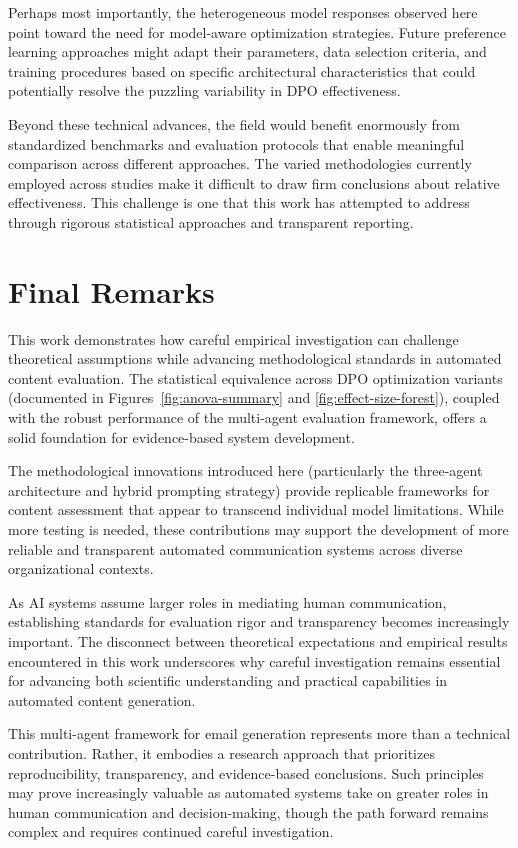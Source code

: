 Perhaps most importantly, the heterogeneous model responses observed here point toward the need for model-aware optimization strategies. Future preference learning approaches might adapt their parameters, data selection criteria, and training procedures based on specific architectural characteristics that could potentially resolve the puzzling variability in DPO effectiveness.

Beyond these technical advances, the field would benefit enormously from standardized benchmarks and evaluation protocols that enable meaningful comparison across different approaches. The varied methodologies currently employed across studies make it difficult to draw firm conclusions about relative effectiveness. This challenge is one that this work has attempted to address through rigorous statistical approaches and transparent reporting.


\section{Final Remarks}
\label{sec:final-remarks}

This work demonstrates how careful empirical investigation can challenge theoretical assumptions while advancing methodological standards in automated content evaluation. The statistical equivalence across DPO optimization variants (documented in Figures~\ref{fig:anova-summary} and \ref{fig:effect-size-forest}), coupled with the robust performance of the multi-agent evaluation framework, offers a solid foundation for evidence-based system development.

The methodological innovations introduced here (particularly the three-agent architecture and hybrid prompting strategy) provide replicable frameworks for content assessment that appear to transcend individual model limitations. While more testing is needed, these contributions may support the development of more reliable and transparent automated communication systems across diverse organizational contexts.

As AI systems assume larger roles in mediating human communication, establishing standards for evaluation rigor and transparency becomes increasingly important. The disconnect between theoretical expectations and empirical results encountered in this work underscores why careful investigation remains essential for advancing both scientific understanding and practical capabilities in automated content generation.

This multi-agent framework for email generation represents more than a technical contribution. Rather, it embodies a research approach that prioritizes reproducibility, transparency, and evidence-based conclusions. Such principles may prove increasingly valuable as automated systems take on greater roles in human communication and decision-making, though the path forward remains complex and requires continued careful investigation.

